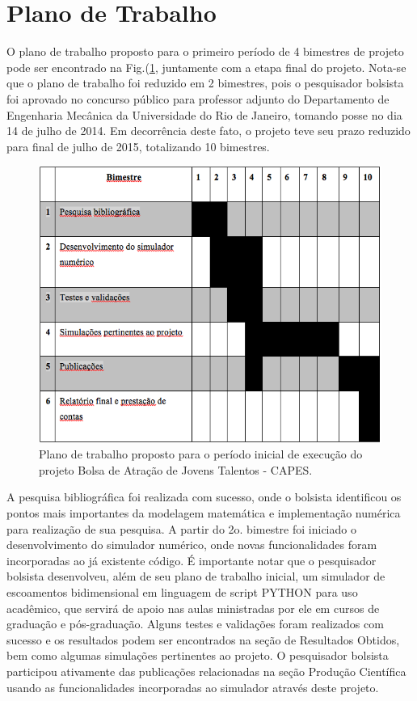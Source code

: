 \documentclass[a4paper,portuges]{article}
\begin{document}
\section{Plano de Trabalho}
O plano de trabalho proposto para o primeiro período de 4 bimestres de
projeto pode ser encontrado na Fig.(\ref{fig:plano}, juntamente com a
etapa final do projeto. Nota-se que o plano de trabalho foi reduzido em
2 bimestres, pois o pesquisador bolsista foi aprovado no concurso
público para professor adjunto do Departamento de Engenharia Mecânica da
Universidade do Rio de Janeiro, tomando posse no dia 14 de julho de
2014. Em decorrência deste fato, o projeto teve seu prazo reduzido para
final de julho de 2015, totalizando 10 bimestres. 

 \begin{figure}[ht!]
 	\begin{center}
 		\includegraphics[angle=0, scale=0.5]{figs/plano.png}
 	\end{center}
 	\caption{Plano de trabalho proposto para o período inicial de
	execução do projeto Bolsa de Atração de Jovens Talentos - CAPES.}
 	\label{fig:plano} 
 \end{figure}

A pesquisa bibliográfica foi realizada com sucesso, onde o bolsista
identificou os pontos mais importantes da modelagem matemática e
implementação numérica para realização de sua pesquisa. A partir do 2o.
bimestre foi iniciado o desenvolvimento do simulador numérico, onde
novas funcionalidades foram incorporadas ao já existente código. É
importante notar que o pesquisador bolsista desenvolveu, além de seu
plano de trabalho inicial, um simulador de escoamentos bidimensional em
linguagem de script PYTHON para uso acadêmico, que servirá de apoio nas
aulas ministradas por ele em cursos de graduação e pós-graduação. Alguns
testes e validações foram realizados com sucesso e os resultados podem
ser encontrados na seção de Resultados Obtidos, bem como algumas
simulações pertinentes ao projeto. O pesquisador bolsista participou
ativamente das publicações relacionadas na seção Produção Científica
usando as funcionalidades incorporadas ao simulador através deste
projeto.
\end{document}
